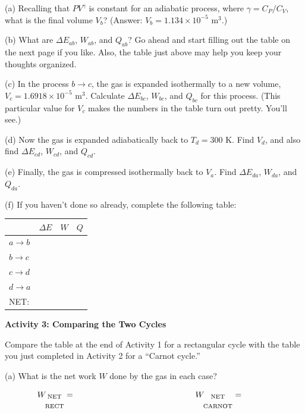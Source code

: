 (a) Recalling that $PV^\gamma$ is constant for an adiabatic process, where $\gamma = C_P / C_V$, what is the final volume $V_b$?  (Answer: $V_b=1.134 \times 10^{-5}$ m$^3$.)  
\answerspace{1.8in}

(b) What are $\Delta E_{ab}$, $W_{ab}$, and $Q_{ab}$?  Go ahead and start filling out the table on the next page if you like.  Also, the table just above may help you keep your thoughts organized.
\answerspace{1.8in}

\pagebreak
(c) In the process $b \rightarrow c$, the gas is expanded isothermally to a new volume, $V_c=1.6918 \times 10^{-5}$ m$^3$.  Calculate $\Delta E_{bc}$, $W_{bc}$, and $Q_{bc}$ for this process.  (This particular value for $V_c$ makes the numbers in the table turn out pretty.  You’ll see.)
\answerspace{1.6in}

(d) Now the gas is expanded adiabatically back to $T_d=300$ K.  Find $V_d$, and also find  $\Delta E_{cd}$, $W_{cd}$, and $Q_{cd}$.
\answerspace{2.0in}


(e) Finally, the gas is compressed isothermally back to $V_a$.  Find $\Delta E_{da}$, $W_{da}$, and $Q_{da}$.  
\answerspace{1.6in}



(f) If you haven’t done so already, complete the following table:
\vspace{0.1 in}

\renewcommand{\arraystretch}{2.0}
\begin{tabular}{| C{1in} |C{1in} | C{1in} | C{1in} |}
\hline
& $\Delta E$ & $W$ & $Q$ \\ \hline
$a \rightarrow b$ & & & \\ \hline
$b \rightarrow c$ & & & \\ \hline
$c \rightarrow d$ & & & \\ \hline
$d \rightarrow a$ & & & \\ \hline
\hline
NET: & & & \\ \hline
\end{tabular}
\renewcommand{\arraystretch}{1.0}

\pagebreak
\textbf{Activity 3: Comparing the Two Cycles}

Compare the table at the end of Activity 1 for a rectangular cycle with the table you just completed in Activity 2 for a ``Carnot cycle.'' 

(a)  What is the net work $W$ done by the gas in each case?

\begin{displaymath}
\hspace{-0.5in} W_{\substack{\textrm{NET} \\ \\ \textrm{RECT}}} =
\hspace{2in} W_{\substack{\textrm{NET} \\ \\ \textrm{CARNOT}}} =
\end{displaymath}


